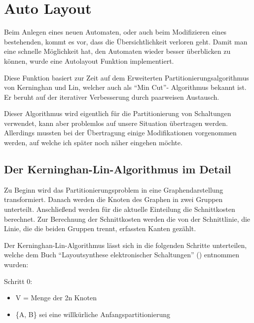 

\chapter{Auto Layout}\label{AutoLayout}

Beim Anlegen eines neuen Automaten, oder auch beim Modifizieren eines
bestehenden, kommt es vor, dass die Übersichtlichkeit verloren geht. Damit man
eine schnelle Möglichkeit hat, den Automaten wieder besser überblicken zu
können, wurde eine Autolayout Funktion implementiert.\vspace{10pt}

Diese Funktion basiert zur Zeit auf dem Erweiterten Partitionierungsalgorithmus
von Kerninghan und Lin, welcher auch als "`Min Cut"'- Algorithmus
bekannt ist. Er beruht auf der iterativer Verbesserung durch paarweisen
Austausch.\vspace{10pt}

Dieser Algorithmus wird eigentlich für die Partitionierung von Schaltungen
verwendet, kann aber problemlos auf unsere Situation übertragen werden.
Allerdings mussten bei der Übertragung einige Modifikationen
vorgenommen werden, auf welche ich später noch näher eingehen
möchte.\vspace{10pt}

\section{Der Kerninghan-Lin-Algorithmus im Detail}

Zu Beginn wird das Partitionierungsproblem in eine Graphendarstellung
transformiert. Danach werden die Knoten des Graphen in zwei Gruppen unterteilt.
Anschließend werden für die aktuelle Einteilung die Schnittkosten berechnet.
Zur Berechnung der Schnittkosten werden die von der Schnittlinie, die Linie, die
die beiden Gruppen trennt, erfassten Kanten gezählt.\vspace{10pt}

Der Kerninghan-Lin-Algorithmus lässt sich in die folgenden Schritte
unterteilen, welche dem Buch "`Layoutsynthese elektronischer
Schaltungen"' (\cite{Layout}) entnommen wurden:\vspace{10pt}

Schritt 0:
\begin{itemize}
  \item V = Menge der 2n Knoten 
  \item \{A, B\} sei eine willkürliche Anfangspartitionierung
\end{itemize}

